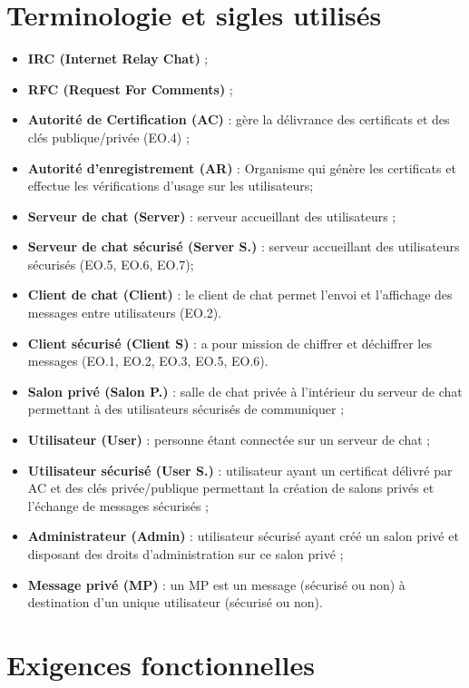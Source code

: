 \documentclass[a4paper,11pt,french]{article}
\begin{document}
\section{Terminologie et sigles utilisés}
\begin{itemize}
\item \textbf{IRC (Internet Relay Chat)} ;
\item \textbf{RFC (Request For Comments)} ;
\item \textbf{Autorité de Certification (AC)} : gère la délivrance des certificats et des clés publique/privée (EO.4) ;
\item \textbf{Autorité d'enregistrement (AR)} : Organisme qui génère les certificats et effectue les vérifications d'usage sur les utilisateurs;
\item \textbf{Serveur de chat (Server)} : serveur accueillant des utilisateurs ;
\item \textbf{Serveur de chat sécurisé (Server S.)} : serveur accueillant des utilisateurs sécurisés (EO.5, EO.6, EO.7);
\item \textbf{Client de chat (Client)} : le client de chat permet l'envoi et l'affichage des messages entre utilisateurs (EO.2).
\item \textbf{Client sécurisé (Client S)} :  a pour mission de chiffrer et déchiffrer les messages (EO.1, EO.2, EO.3, EO.5, EO.6).
\item \textbf{Salon privé (Salon P.)} : salle de chat privée à l'intérieur du serveur de chat permettant à des utilisateurs sécurisés de communiquer ;
\item \textbf{Utilisateur (User)} : personne étant connectée sur un serveur de chat ;
\item \textbf{Utilisateur sécurisé (User S.)} : utilisateur ayant un certificat délivré par AC et des clés privée/publique permettant la création de salons privés et l'échange de messages sécurisés ;
\item \textbf{Administrateur (Admin)} : utilisateur sécurisé ayant créé un salon privé et disposant des droits d'administration sur ce salon privé ;
\item \textbf{Message privé (MP)} : un MP est un message (sécurisé ou non) à destination d'un unique utilisateur (sécurisé ou non).
\end{itemize}

\section{Exigences fonctionnelles}
\end{document}
